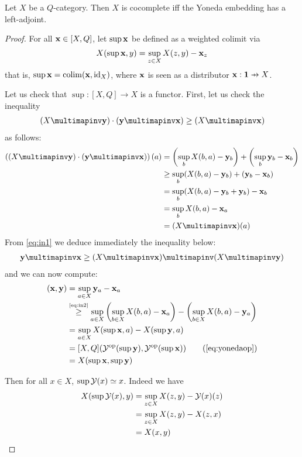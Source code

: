 \begin{proposition}\label{prop:yonedasup}
Let $X$ be a $Q$-category. Then $X$ is cocomplete iff the Yoneda embedding has a left-adjoint.
\end{proposition}
\begin{proof}
 For all $\mathbf{x}\in [X,Q]$, let $\sup\mathbf{x}$ be defined as a weighted colimit via
$$
X(\sup\mathbf{x}, y)= \sup_{z\in X} X(z,y)-\mathbf{x}_{z}
$$
that is, $\sup \mathbf{x}= \mathrm{colim}( \mathbf{x}, \mathrm{id}_{X})$, where $\mathbf{x}$ is seen as a distributor $\B x:\B 1\pfun X$.


Let us check that $\sup: [X,Q]\to X$ is a functor. First, let us check the  inequality
\begin{align}\label{eq:in1}
(X\multimapinv\B y)\cdot (\B y\multimapinv\B x)\geq (X\multimapinv\B x)\end{align}
as follows:
\begin{align*}
\left((X\multimapinv \B y)\cdot (\B y\multimapinv\B x)\right)(a)&=
 \left (\sup_{b}X(b,a)-\B y_{b}\right)+\left(\sup_{b}\B y_{b}-\B x_{b}\right)\\
&\geq
\sup_{b}(X(b,a)-\B y_{b})+(\B y_{b}-\B x_{b})
\\
&=\sup_{b}(X(b,a)-\B y_{b}+\B y_{b})-\B x_{b}
\\
&=\sup_{b} X(b,a)-\B x_{a}\\
&= (X\multimapinv \B x)(a)
\end{align*}
From \eqref{eq:in1} we deduce immediately the inequality below:
\begin{align}\label{eq:in2}
\B y\multimapinv \B x \geq (X\multimapinv \B x)\multimapinv(X\multimapinv\B y)
\end{align}
and we can now compute:
\begin{align*}
[X,Q](\B x, \B y)&= \sup_{a\in X}\B y_{a}-\B x_{a}\\
 &\stackrel{\tiny\eqref{eq:in2}}{\geq}
 \sup_{a\in X} \left( \sup_{b\in X}X(b,a)-\B x_{a}\right) -\left(  \sup_{b\in X}X(b,a)-\B y_{a}   \right )\\
 &= \sup_{a\in X}X(\sup \B x, a)-X(\sup \B y, a)\\
 &= [X,Q](\C Y^{\mathrm{op}}(\sup\B y),\C Y^{\mathrm{op}}(\sup \B x))
 \tag{\ref{eq:yonedaop}}
 \\
&=X(\sup \B x, \sup \B y)
\end{align*}


Then for all $x\in X$, $\sup \mathcal{Y}(x)\simeq x$. Indeed we have 
\begin{align*}
X(\sup \mathcal{Y}(x), y) & = \sup_{z\in X}X(z,y) -\mathcal{Y}(x)(z) \\
& = \sup_{z\in X}X(z,y)-X(z,x)\\
&= X(x,y)
\end{align*}
%


\end{proof}

